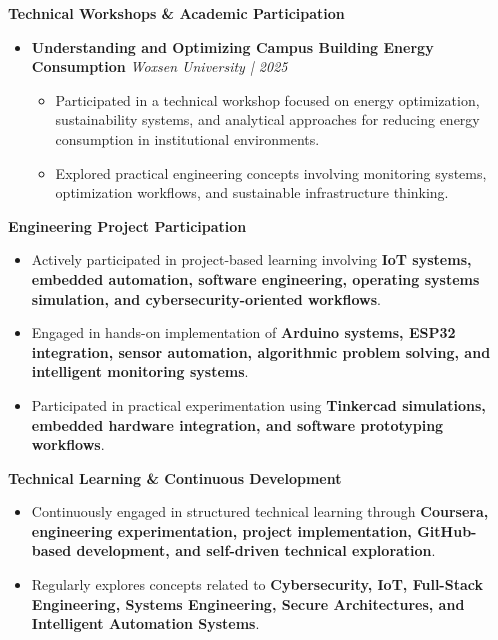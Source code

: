 \documentclass[a4paper,11pt]{article}
\begin{document}
\textbf{Technical Workshops \& Academic Participation}
\begin{itemize}

    \item \textbf{Understanding and Optimizing Campus Building Energy Consumption}
    \hfill \textit{Woxsen University | 2025}

    \begin{itemize}
        \item Participated in a technical workshop focused on energy optimization, sustainability systems, and analytical approaches for reducing energy consumption in institutional environments.
        
        \item Explored practical engineering concepts involving monitoring systems, optimization workflows, and sustainable infrastructure thinking.
    \end{itemize}

\end{itemize}

\vspace{4pt}

\textbf{Engineering Project Participation}
\begin{itemize}

    \item Actively participated in project-based learning involving \textbf{IoT systems, embedded automation, software engineering, operating systems simulation, and cybersecurity-oriented workflows}.

    \item Engaged in hands-on implementation of \textbf{Arduino systems, ESP32 integration, sensor automation, algorithmic problem solving, and intelligent monitoring systems}.

    \item Participated in practical experimentation using \textbf{Tinkercad simulations, embedded hardware integration, and software prototyping workflows}.

\end{itemize}

\vspace{4pt}

\textbf{Technical Learning \& Continuous Development}
\begin{itemize}

    \item Continuously engaged in structured technical learning through \textbf{Coursera, engineering experimentation, project implementation, GitHub-based development, and self-driven technical exploration}.

    \item Regularly explores concepts related to \textbf{Cybersecurity, IoT, Full-Stack Engineering, Systems Engineering, Secure Architectures, and Intelligent Automation Systems}.

\end{itemize}
\end{document}
